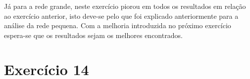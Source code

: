 \documentclass[pdftex,12pt,a4paper]{report}
\begin{document}

Já para a rede grande, neste exercício piorou em todos os resultados em relação ao exercício anterior, isto deve-se pelo que foi explicado anteriormente para a análise da rede pequena. Com a melhoria introduzida no próximo exercício espera-se que os resultados sejam os melhores encontrados.





\section{Exercício 14}
\end{document}
